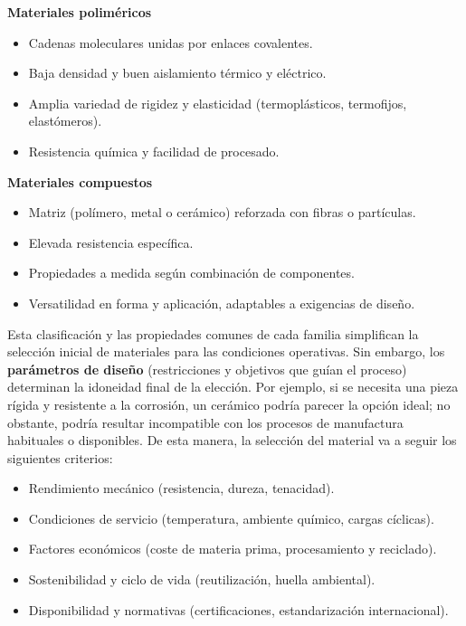 \textbf{Materiales poliméricos}
  
    \begin{itemize}
      \item Cadenas moleculares unidas por enlaces covalentes.
      \item Baja densidad y buen aislamiento térmico y eléctrico.
      \item Amplia variedad de rigidez y elasticidad (termoplásticos, termofijos, elastómeros).
      \item Resistencia química y facilidad de procesado.
    \end{itemize}

\textbf{Materiales compuestos}
  
    \begin{itemize}
      \item Matriz (polímero, metal o cerámico) reforzada con fibras o partículas.
      \item Elevada resistencia específica.
      \item Propiedades a medida según combinación de componentes.
      \item Versatilidad en forma y aplicación, adaptables a exigencias de diseño.
    \end{itemize}

Esta clasificación y las propiedades comunes de cada familia simplifican la selección inicial de materiales para las condiciones operativas. Sin embargo, los \textbf{parámetros de diseño} (restricciones y objetivos que guían el proceso) determinan la idoneidad final de la elección. Por ejemplo, si se necesita una pieza rígida y resistente a la corrosión, un cerámico podría parecer la opción ideal; no obstante, podría resultar incompatible con los procesos de manufactura habituales o disponibles. De esta manera, la selección del material va a seguir los siguientes criterios:

\begin{itemize}
    \item Rendimiento mecánico (resistencia, dureza, tenacidad).
    \item Condiciones de servicio (temperatura, ambiente químico, cargas cíclicas).
    \item Factores económicos (coste de materia prima, procesamiento y reciclado).
    \item  Sostenibilidad y ciclo de vida (reutilización, huella ambiental).
    \item Disponibilidad y normativas (certificaciones, estandarización internacional).
\end{itemize}

